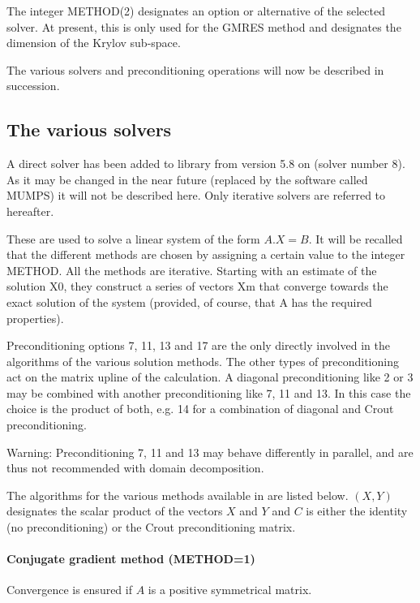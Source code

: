 The integer METHOD(2) designates an option or alternative of the selected
solver. At present, this is only used for the GMRES method and designates the
dimension of the Krylov sub-space.

The various solvers and preconditioning operations will now be described in
succession.

\subsection{The various solvers}

A direct solver has been added to library \bief from version 5.8 on (solver
number 8). As it may be changed in the near future (replaced by the software
called MUMPS) it will not be described here. Only iterative solvers are
referred to hereafter.

These are used to solve a linear system of the form $A.X = B$. It will be
recalled that the different methods are chosen by assigning a certain value to
the integer METHOD. All the  methods are iterative. Starting with an estimate
of the solution X0, they construct a series of vectors Xm that converge towards
the exact solution of the system (provided, of course, that A has the required
properties).

Preconditioning options 7, 11, 13 and 17 are the only directly involved in the
algorithms of the various solution methods. The other types of preconditioning
act on the matrix upline of the calculation. A diagonal preconditioning like 2
or 3 may be combined with another preconditioning like 7, 11 and 13. In this
case the choice is the product of both, e.g. 14 for a combination of diagonal
and Crout preconditioning.

\begin{WarningBlock}{Warning:}
Preconditioning 7, 11 and 13 may behave differently in parallel, and are
thus not recommended with domain decomposition.
\end{WarningBlock}

The algorithms for the various methods available in \bief are listed below.
$(X,Y)$ designates the scalar product of the vectors $X$ and $Y$ and $C$ is either the
identity (no preconditioning) or the Crout preconditioning matrix.

\paragraph{Conjugate gradient method (METHOD=1)}

Convergence is ensured if $A$ is a positive symmetrical matrix.

